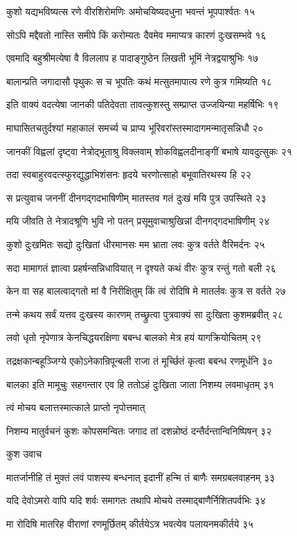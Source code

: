 कुशो यद्यभविष्यत्स रणे वीरशिरोमणिः
अमोचयिष्यदधुना भवन्तं भूपपार्श्वतः १५

सोऽपि मद्दैवतो नास्ति समीपे किं करोम्यतः
दैवमेव ममाप्यत्र कारणं दुःखसम्भवे १६

एवमादि बहुश्रीमत्येषा वै विललाप ह
पादाङ्गुष्ठेन लिखती भूमिं नेत्रद्वयाश्रुभिः १७

बालान्प्रति जगादासौ पृथुकः स च भूपतिः
कथं मत्सुतमापात्य रणे कुत्र गमिष्यति १८

इति वाक्यं वदत्येषा जानकी पतिदेवता
तावत्कुशस्तु सम्प्राप्त उज्जयिन्या महर्षिभिः १९

माघासितचतुर्दश्यां महाकालं समर्च्य च
प्राप्य भूरिवरांस्तस्मादागमन्मातृसन्निधौ २०

जानकीं विह्वलां दृष्ट्वा नेत्रोद्भूताश्रु विक्लवाम्
शोकविह्वलदीनाङ्गीं बभाषे यावदुत्सुकः २१

तदा स्वबाहुरवदत्स्फुरद्युद्धाभिशंसनः
हृदये चरणोत्साहो बभूवातिरथस्य हि २२

स प्रत्युवाच जननीं दीनगद्गदभाषिणीम्
मातस्तव गतं दुःखं मयि पुत्र उपस्थिते २३

मयि जीवति ते नेत्रादश्रूणि भुवि नो पतन्
प्रसूमुवाचाश्रुखिन्नां दीनगद्गदभाषिणीम् २४

कुशो दुःखमितः सद्यो दुःखितां धीरमानसः
मम भ्राता लवः कुत्र वर्तते वैरिमर्दनः २५

सदा मामागतं ज्ञात्वा प्रहर्षन्सन्निधावियात्
न दृश्यते कथं वीरः कुत्र रन्तुं गतो बली २६

केन वा सह बालत्वाद्गतो मां वै निरीक्षितुम्
किं त्वं रोदिषि मे मातर्लवः कुत्र स वर्तते २७

तन्मे कथय सर्वं यत्तव दुःखस्य कारणम्
तच्छ्रुत्वा पुत्रवाक्यं सा दुःखिता कुशमब्रवीत् २८

लवो धृतो नृपेणात्र केनचिद्धयरक्षिणा
बबन्ध बालको मेत्र हयं यागक्रियोचितम् २९

तद्रक्षकान्बहूञ्जिग्ये एकोऽनेकान्रिपून्बली
राजा तं मूर्च्छितं कृत्वा बबन्ध रणमूर्धनि ३०

बालका इति मामूचुः सहगन्तार एव हि
ततोऽहं दुःखिता जाता निशम्य लवमाधृतम् ३१

त्वं मोचय बलात्तस्मात्काले प्राप्तो नृपोत्तमात्

निशम्य मातुर्वचनं कुशः कोपसमन्वितः
जगाद तां दशन्नोष्ठं दन्तैर्दन्तान्विनिष्पिषन् ३२

कुश उवाच

मातर्जानीहि तं मुक्तं लवं पाशस्य बन्धनात्
इदानीं हन्मि तं बाणैः समग्रबलवाहनम् ३३

यदि देवोऽमरो वापि यदि शर्वः समागतः
तथापि मोचये तस्माद्बाणैर्निशितपर्वभिः ३४

मा रोदिषि मातरिह वीराणां रणमूर्छितम्
कीर्तयेऽत्र भवत्येव पलायनमकीर्तये ३५

